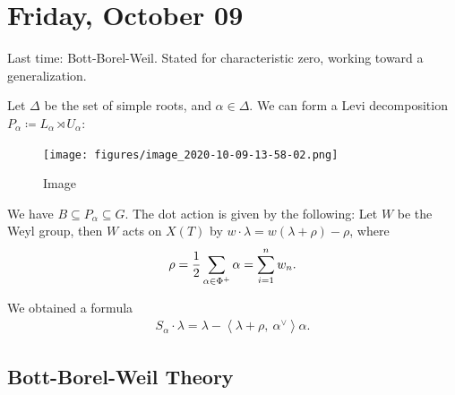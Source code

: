 \hypertarget{friday-october-09}{%
\section{Friday, October 09}\label{friday-october-09}}

Last time: Bott-Borel-Weil. Stated for characteristic zero, working
toward a generalization.

Let \(\Delta\) be the set of simple roots, and \(\alpha\in \Delta\). We
can form a Levi decomposition
\(P_\alpha \coloneqq L_\alpha \rtimes U_\alpha\):

\begin{figure}
\centering
\texttt{[image: figures/image\_2020-10-09-13-58-02.png]}
\caption{Image}
\end{figure}

We have \(B \subseteq P_\alpha \subseteq G\). The dot action is given by
the following: Let \(W\) be the Weyl group, then \(W\) acts on \(X(T)\)
by \(w\cdot \lambda = w(\lambda + \rho) - \rho\), where
\begin{align*}  
\rho = {1\over 2} \sum_{\alpha\in \Phi^+} \alpha = \sum_{i=1}^n w_n
.\end{align*}

We obtained a formula
\begin{align*}  
S_\alpha \cdot \lambda = \lambda - {\left\langle {\lambda  + \rho},~{\alpha^\vee} \right\rangle} \alpha
.\end{align*}

\hypertarget{bott-borel-weil-theory}{%
\subsection{Bott-Borel-Weil Theory}\label{bott-borel-weil-theory}}

